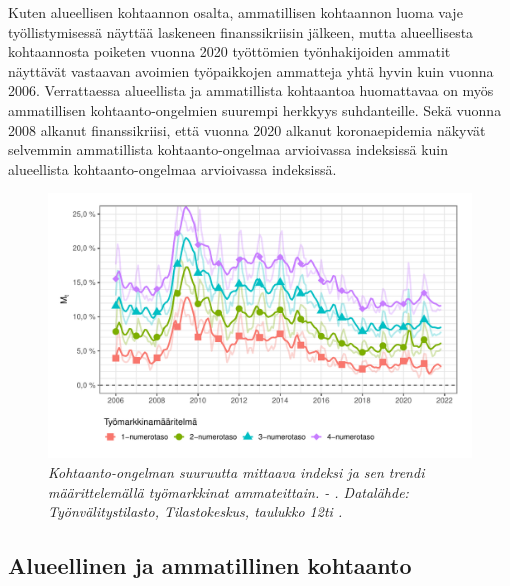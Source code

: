 \documentclass[12pt]{article}
\newcommand{\lastdatamonth}{\unskip}
\newcommand{\firstdatamonth}{\unskip}
\newcommand{\newcaption}[1]{\caption{\textit{\footnotesize{#1}}}}
\begin{document}
Kuten alueellisen kohtaannon osalta, ammatillisen kohtaannon luoma vaje työllistymisessä näyttää laskeneen finanssikriisin jälkeen, mutta alueellisesta kohtaannosta poiketen vuonna 2020 työttömien työnhakijoiden ammatit näyttävät vastaavan avoimien työpaikkojen ammatteja yhtä hyvin kuin vuonna 2006. Verrattaessa alueellista ja ammatillista kohtaantoa huomattavaa on myös ammatillisen kohtaanto-ongelmien suurempi herkkyys suhdanteille. Sekä vuonna 2008 alkanut finanssikriisi, että vuonna 2020 alkanut koronaepidemia näkyvät selvemmin ammatillista kohtaanto-ongelmaa arvioivassa indeksissä kuin alueellista kohtaanto-ongelmaa arvioivassa indeksissä. 

\begin{figure}
\centering
\includegraphics[scale = 0.8]{../kuviot/indeksi_ammateittain.pdf}
    \newcaption{Kohtaanto-ongelman suuruutta mittaava indeksi ja sen trendi määrittelemällä työmarkkinat ammateittain. \protect \firstdatamonth \phantom{} - \protect\lastdatamonth. Datalähde: Työnvälitystilasto, Tilastokeskus, taulukko 12ti \protect \cite{svt2011}.}
   \label{fig:kd982}
\end{figure}

\subsection{Alueellinen ja ammatillinen kohtaanto} \label{section:alueellinen ja ammatillinen kohtaanto}
\end{document}
